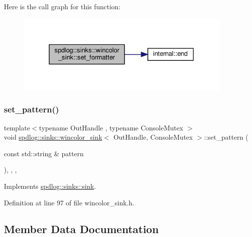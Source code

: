 Here is the call graph for this function\+:
\nopagebreak
\begin{figure}[H]
\begin{center}
\leavevmode
\includegraphics[width=302pt]{classspdlog_1_1sinks_1_1wincolor__sink_a48cc1a252565bdbb66b12ba2a40e62f9_cgraph}
\end{center}
\end{figure}
\mbox{\label{classspdlog_1_1sinks_1_1wincolor__sink_a5032da6fc760507134a7d1eff1a20b0a}} 
\subsubsection{\texorpdfstring{set\+\_\+pattern()}{set\_pattern()}}
{\footnotesize\ttfamily template$<$typename Out\+Handle , typename Console\+Mutex $>$ \\
void \hyperlink{classspdlog_1_1sinks_1_1wincolor__sink}{spdlog\+::sinks\+::wincolor\+\_\+sink}$<$ Out\+Handle, Console\+Mutex $>$\+::set\+\_\+pattern (\begin{DoxyParamCaption}\item[{const std\+::string \&}]{pattern }\end{DoxyParamCaption})\hspace{0.3cm}{\ttfamily [inline]}, {\ttfamily [final]}, {\ttfamily [override]}, {\ttfamily [virtual]}}



Implements \hyperlink{classspdlog_1_1sinks_1_1sink_a7e5cfd4b683c8bfa8fbd602d7f409632}{spdlog\+::sinks\+::sink}.



Definition at line 97 of file wincolor\+\_\+sink.\+h.



\subsection{Member Data Documentation}
\mbox{\label{classspdlog_1_1sinks_1_1wincolor__sink_a77ef730edcfe9f6f000bed8c846aa6bf}} 
